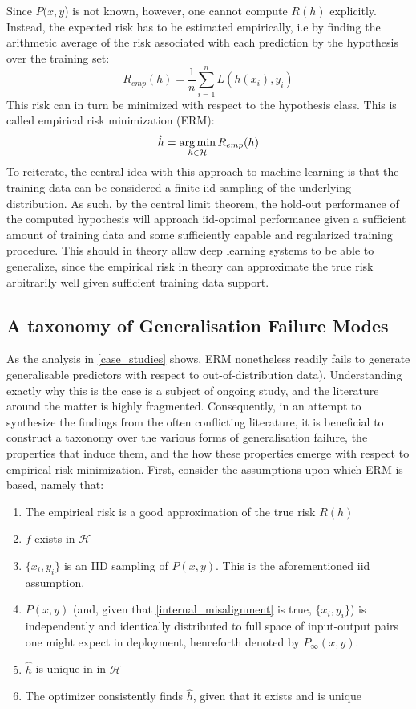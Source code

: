 		Since \(P(x,y\)) is not known, however, one cannot compute \(R(h)\) explicitly. Instead, the expected risk has to be estimated empirically, i.e by finding the arithmetic average of the risk associated with each prediction by the hypothesis over the training set:
		\begin{equation}
		R_{emp}(h) = \frac{1}{n}\sum_{i=1}^{n}L(h(x_i), y_i)
		\end{equation}
		This risk can in turn be minimized with respect to the hypothesis class. This is called empirical risk minimization (ERM):
		\begin{equation}
		\hat{h} = \operatorname*{arg\,min}_{h \in \mathcal{H}}R_{emp}(h)
		\end{equation}
		To reiterate, the central idea with this approach to machine learning is that the training data can be considered a finite iid sampling of the underlying distribution. As such, by the central limit theorem, the hold-out performance of the computed hypothesis will approach iid-optimal performance given a sufficient amount of training data and some sufficiently capable and regularized training procedure. This should in theory allow deep learning systems to be able to generalize, since the empirical risk in theory can approximate the true risk arbitrarily well given sufficient training data support.
	\subsection{A taxonomy of Generalisation Failure Modes}
		As the analysis in \ref{case_studies} shows, ERM nonetheless readily fails to generate generalisable predictors with respect to out-of-distribution data). Understanding exactly why this is the case is a subject of ongoing study, and the literature around the matter is highly fragmented. Consequently, in an attempt to synthesize the findings from the often conflicting literature, it is beneficial to construct a taxonomy over the various forms of generalisation failure, the properties that induce them, and the how these properties emerge with respect to empirical risk minimization. First, consider the assumptions upon which ERM is based, namely that:
		\begin{enumerate}
			\item The empirical risk is a good approximation of the true risk \(R(h)\) \label{overfit}
			\item \(f\) exists in \(\mathcal{H}\) \label{underfit}
			\item \(\{x_i, y_i\}\) is an IID sampling of \(P(x,y)\). This is the aforementioned iid assumption. \label{internal_misalignment}
			\item \(P(x,y)\) (and, given that \ref{internal_misalignment} is true, \(\{x_i, y_i\}\)) is independently and identically distributed to full space of input-output pairs one might expect in deployment, henceforth denoted by \(P_{\infty}(x,y)\). \label{external_misalignment}
			\item \(\hat{h}\) is unique in in \(\mathcal{H}\) \label{underspecification}
			\item The optimizer consistently finds \(\hat{h}\), given that it exists and is unique \label{opt}
		\end{enumerate}  	
		
